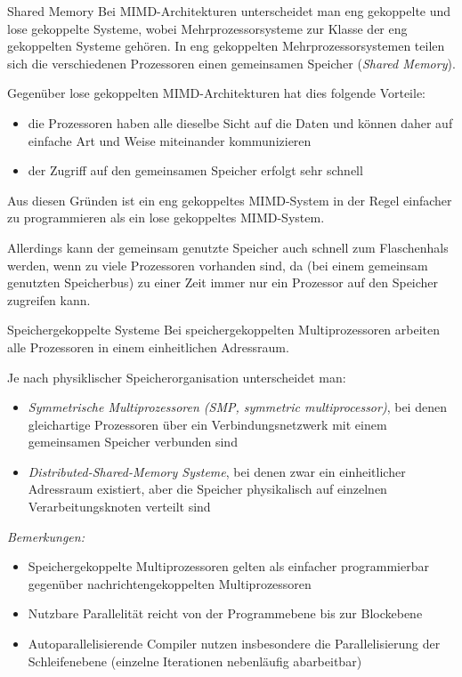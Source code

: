 \begin{defi}{Shared Memory}
    Bei MIMD-Architekturen unterscheidet man eng gekoppelte und lose gekoppelte Systeme, wobei Mehrprozessorsysteme zur Klasse der eng gekoppelten Systeme gehören.
    In eng gekoppelten Mehrprozessorsystemen teilen sich die verschiedenen Prozessoren einen gemeinsamen Speicher (\emph{Shared Memory}).
    
    Gegenüber lose gekoppelten MIMD-Architekturen hat dies folgende Vorteile:
    \begin{itemize}
        \item die Prozessoren haben alle dieselbe Sicht auf die Daten und können daher auf einfache Art und Weise miteinander kommunizieren
        \item der Zugriff auf den gemeinsamen Speicher erfolgt sehr schnell
    \end{itemize}
    
    Aus diesen Gründen ist ein eng gekoppeltes MIMD-System in der Regel einfacher zu programmieren als ein lose gekoppeltes MIMD-System.
    
    Allerdings kann der gemeinsam genutzte Speicher auch schnell zum Flaschenhals werden, wenn zu viele Prozessoren vorhanden sind, da (bei einem gemeinsam genutzten Speicherbus) zu einer Zeit immer nur ein Prozessor auf den Speicher zugreifen kann.
\end{defi}

\begin{defi}{Speichergekoppelte Systeme}
    Bei speichergekoppelten Multiprozessoren arbeiten alle Prozessoren in einem einheitlichen Adressraum.
    
    Je nach physiklischer Speicherorganisation unterscheidet man:
    \begin{itemize}
        \item \emph{Symmetrische Multiprozessoren (SMP, symmetric multiprocessor)},
              bei denen gleichartige Prozessoren über ein Verbindungsnetzwerk mit einem gemeinsamen Speicher verbunden sind
        \item \emph{Distributed-Shared-Memory Systeme},
              bei denen zwar ein einheitlicher Adressraum existiert,
              aber die Speicher physikalisch auf einzelnen Verarbeitungsknoten verteilt sind
    \end{itemize}
    
    \emph{Bemerkungen:}
    \begin{itemize}
        \item Speichergekoppelte Multiprozessoren gelten als einfacher programmierbar gegenüber nachrichtengekoppelten Multiprozessoren
        \item Nutzbare Parallelität reicht von der Programmebene bis zur Blockebene
        \item Autoparallelisierende Compiler nutzen insbesondere die Parallelisierung der Schleifenebene (einzelne Iterationen nebenläufig abarbeitbar)
    \end{itemize}
\end{defi}

